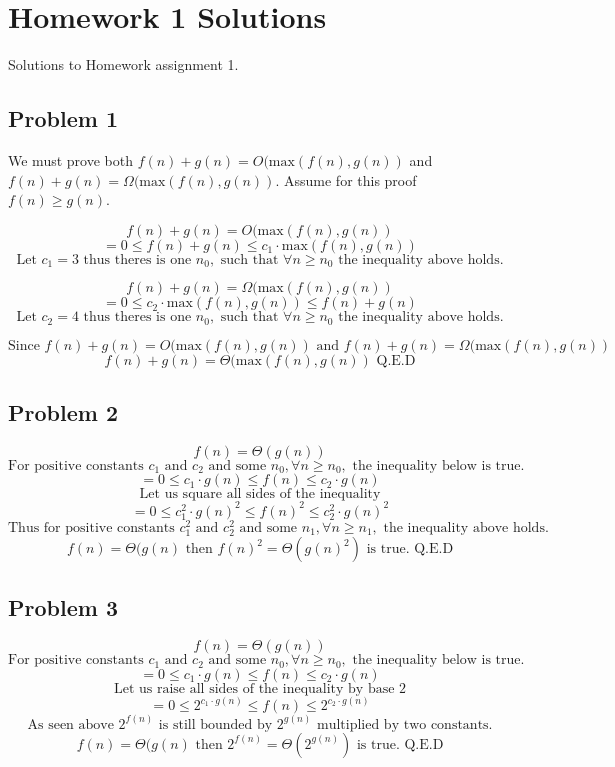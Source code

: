 \documentclass{article}
\begin{document}
\section{Homework 1 Solutions}

Solutions to Homework assignment 1.

\subsection{Problem 1}

We must prove both $f(n) + g(n) = O(\text{max}(f(n),g(n))$ and $f(n) + g(n) = \Omega(\text{max}(f(n),g(n))$. Assume for this proof $f(n) \ge g(n)$.

$$f(n) + g(n) = O(\text{max}(f(n),g(n))$$
$$= 0 \le f(n) + g(n) \le c_1 \cdot \text{max}(f(n),g(n))$$
$$\text{Let } c_1 = 3 \text{ thus theres is one } n_0, \text{ such that } \forall n \ge n_0 \text{ the inequality above holds.}$$

$$f(n) + g(n) = \Omega(\text{max}(f(n),g(n))$$
$$= 0 \le c_2 \cdot \text{max}(f(n),g(n)) \le f(n) + g(n) $$
$$\text{Let } c_2 = 4 \text{ thus theres is one } n_0, \text{ such that } \forall n \ge n_0 \text{ the inequality above holds.}$$

$$\text{Since } f(n) + g(n) = O(\text{max}(f(n),g(n)) \text{ and } f(n) + g(n) = \Omega(\text{max}(f(n),g(n)) $$
$$f(n) + g(n) = \Theta(\text{max}(f(n),g(n)) \text{ Q.E.D}$$

\subsection{Problem 2}

$$f(n) = \Theta(g(n)) $$
$$\text{For positive constants } c_1 \text{ and } c_2 \text{ and some } n_0, \forall n \ge n_0, \text{ the inequality below is true.}$$
$$= 0 \le c_1 \cdot g(n) \le f(n) \le c_2 \cdot g(n) $$
$$\text{Let us square all sides of the inequality}$$
$$= 0 \le c_1^2 \cdot g(n)^2 \le f(n)^2 \le c_2^2 \cdot g(n)^2 $$
$$\text{Thus for positive constants } c_{1}^2 \text{ and } c_{2}^2 \text{ and some } n_1, \forall n \ge n_1,\text{ the inequality above holds.}$$
$$f(n) = \Theta(g(n) \text{ then } f(n)^2 = \Theta(g(n)^2) \text{ is true. Q.E.D} $$

\subsection{Problem 3}

$$f(n) = \Theta(g(n)) $$
$$\text{For positive constants } c_1 \text{ and } c_2 \text{ and some } n_0, \forall n \ge n_0, \text{ the inequality below is true.}$$
$$= 0 \le c_1 \cdot g(n) \le f(n) \le c_2 \cdot g(n) $$
$$\text{Let us raise all sides of the inequality by base 2}$$
$$= 0 \le 2^{c_1 \cdot g(n)} \le f(n) \le 2^{c_2 \cdot g(n)} $$
$$\text{As seen above } 2^{f(n)} \text{ is still bounded by } 2^{g(n)} \text{ multiplied by two constants.}$$
$$f(n) = \Theta(g(n) \text{ then } 2^{f(n)} = \Theta(2^{g(n)}) \text{ is true. Q.E.D} $$
\end{document}
